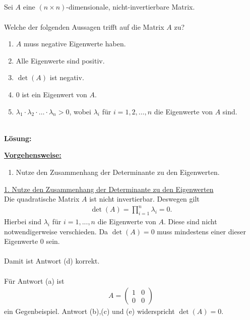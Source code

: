 \newpage
\subsection*{}
Sei $A$ eine $(n \times n)$-dimensionale, nicht-invertierbare Matrix.\\
\\
Welche der folgenden Aussagen trifft auf die Matrix $A$ zu?
\renewcommand{\labelenumi}{(\alph{enumi})}
\begin{enumerate}
	\item 
	$A$ muss negative Eigenwerte haben.
	\item
	Alle Eigenwerte sind positiv.
	\item
	$\det(A)$ ist negativ.
	\item
	$0$ ist ein Eigenwert von $A$.
	\item 
	$\lambda_1 \cdot \lambda_2 \cdot \dots \cdot \lambda_n > 0 $, wobei $\lambda_i$ für $i = 1,2,\dots,n$ die Eigenwerte von $A$ sind.
\end{enumerate}
\ \\
\textbf{Lösung:}
\begin{mdframed}
	\underline{\textbf{Vorgehensweise:}}
	\renewcommand{\labelenumi}{\theenumi.}
	\begin{enumerate}
		\item Nutze den Zusammenhang der Determinante zu den Eigenwerten.
	\end{enumerate}
\end{mdframed}

\underline{1. Nutze den Zusammenhang der Determinante zu den Eigenwerten}\\
Die quadratische Matrix $A$ ist nicht invertierbar. Deswegen gilt
\begin{align*}
	\det(A) = \prod \limits_{i=1}^n \lambda_i = 0.
\end{align*}
Hierbei sind $\lambda_i$ für $i = 1, ..., n$ die Eigenwerte von $A$. Diese sind nicht notwendigerweise verschieden.
Da $\det(A) = 0$ muss mindestens einer dieser Eigenwerte $0$ sein. \\
\\
Damit ist Antwort (d) korrekt.\\
\\
Für Antwort (a) ist
\begin{align*}
	A = 
	\begin{pmatrix}
		1 & 0\\
		0 & 0
	\end{pmatrix}
\end{align*}
ein Gegenbeispiel. Antwort (b),(c) und (e) widerspricht $\det(A) = 0$.
 